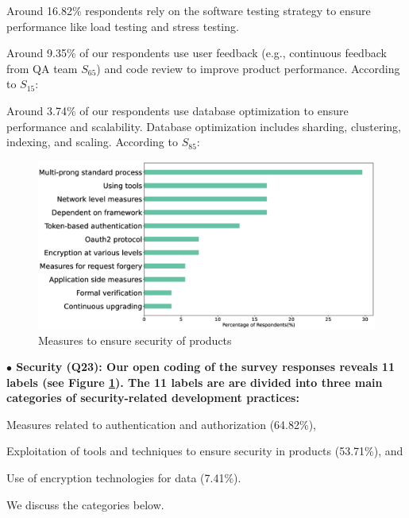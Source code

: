\begin{inparaenum}[(1)]
\item {} Around 16.82\% respondents rely on the software testing strategy to ensure performance like load testing and stress testing.

\item {} Around 9.35\% of our respondents use user feedback (e.g., continuous feedback from QA team $S_{65}$) 
and code review to improve product performance. According to $S_{15}$: 

\item {} Around 3.74\% of our respondents use database optimization to ensure performance and scalability. Database optimization includes sharding, clustering, indexing, and scaling. According to $S_{85}$: 

\end{inparaenum}


\begin{figure}[h]
\centering
\includegraphics[scale=0.22]{Figures/Security.eps} 
\caption{Measures to ensure security of products}
\label{fig:Measures to ensure security}
\end{figure}
\nd\bf{$\bullet$ Security (Q23):} Our open coding of the survey responses reveals 11  
labels (see Figure \ref{fig:Measures to ensure security}). The 11 labels are are divided into three main categories of security-related development practices: 
\begin{inparaenum}
\item Measures related to authentication and authorization (64.82\%),
\item Exploitation of tools and techniques to ensure security in products (53.71\%), and 
\item Use of encryption technologies for data (7.41\%).
\end{inparaenum} We discuss the categories below.  


